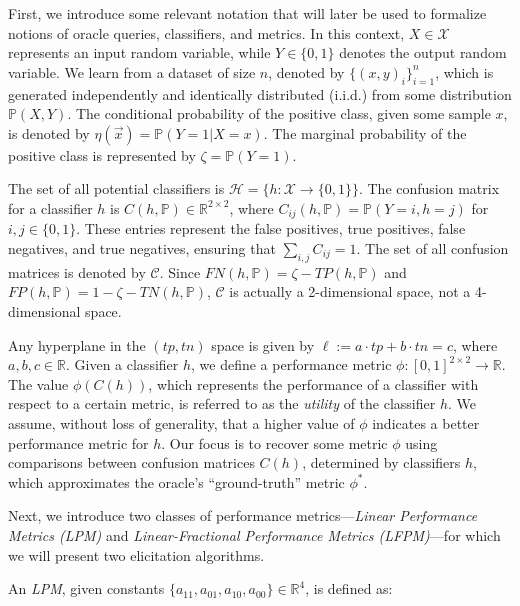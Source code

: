 \documentclass[
  letterpaper,
  numbers=noenddot,
  DIV=11]{scrreprt}
\theoremstyle{definition}
\theoremstyle{plain}
\theoremstyle{plain}
\theoremstyle{remark}
\begin{document}
First, we introduce some relevant notation that will later be used to
formalize notions of oracle queries, classifiers, and metrics. In this
context, \(X \in \mathcal{X}\) represents an input random variable,
while \(Y \in \{0, 1\}\) denotes the output random variable. We learn
from a dataset of size \(n\), denoted by \(\{(x, y)_i\}^n_{i=1}\), which
is generated independently and identically distributed (i.i.d.) from
some distribution \(\mathbb{P}(X, Y)\). The conditional probability of
the positive class, given some sample \(x\), is denoted by
\(\eta(\vec{x}) = \mathbb{P}(Y=1 | X=x)\). The marginal probability of
the positive class is represented by \(\zeta = \mathbb{P}(Y=1)\).

The set of all potential classifiers is
\(\mathcal{H} = \{h : \mathcal{X} \rightarrow \{0,1\}\}\). The confusion
matrix for a classifier \(h\) is
\(C(h, \mathbb{P}) \in \mathbb{R}^{2 \times 2}\), where
\(C_{ij}(h, \mathbb{P}) = \mathbb{P}(Y=i, h=j)\) for
\(i, j \in \{0,1\}\). These entries represent the false positives, true
positives, false negatives, and true negatives, ensuring that
\(\sum_{i,j}C_{ij}=1\). The set of all confusion matrices is denoted by
\(\mathcal{C}\). Since \(FN(h, \mathbb{P}) = \zeta - TP(h, \mathbb{P})\)
and \(FP(h, \mathbb{P}) = 1 - \zeta - TN(h, \mathbb{P})\),
\(\mathcal{C}\) is actually a 2-dimensional space, not a 4-dimensional
space.

Any hyperplane in the \((tp, tn)\) space is given by
\(\ell := a \cdot tp + b \cdot tn = c\), where
\(a, b, c \in \mathbb{R}\). Given a classifier \(h\), we define a
performance metric
\(\phi : [0, 1]^{2 \times 2} \rightarrow \mathbb{R}\). The value
\(\phi(C(h))\), which represents the performance of a classifier with
respect to a certain metric, is referred to as the \emph{utility} of the
classifier \(h\). We assume, without loss of generality, that a higher
value of \(\phi\) indicates a better performance metric for \(h\). Our
focus is to recover some metric \(\phi\) using comparisons between
confusion matrices \(C(h)\), determined by classifiers \(h\), which
approximates the oracle's ``ground-truth'' metric \(\phi^*\).

Next, we introduce two classes of performance metrics---\emph{Linear
Performance Metrics (LPM)} and \emph{Linear-Fractional Performance
Metrics (LFPM)}---for which we will present two elicitation algorithms.

An \emph{LPM}, given constants
\(\{a_{11}, a_{01}, a_{10}, a_{00}\} \in \mathbb{R}^{4}\), is defined
as:
\end{document}
